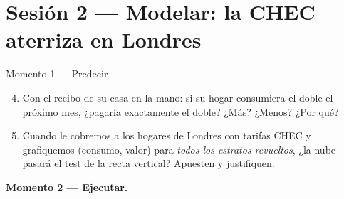\documentclass[12pt,letterpaper]{article}
\begin{document}
\section{Sesión 2 --- Modelar: la CHEC aterriza en Londres}

\begin{cajaprediccion}{Momento 1 --- Predecir}
\begin{enumerate}[label=P\arabic*., itemsep=0.1em]
    \setcounter{enumi}{3}
    \item Con el recibo de su casa en la mano: si su hogar consumiera el doble el próximo mes, ¿pagaría exactamente el doble? ¿Más? ¿Menos? ¿Por qué?
    \item Cuando le cobremos a los hogares de Londres con tarifas CHEC y grafiquemos (consumo, valor) para \emph{todos los estratos revueltos}, ¿la nube pasará el test de la recta vertical? Apuesten y justifiquen.
\end{enumerate}
\end{cajaprediccion}

\textbf{Momento 2 --- Ejecutar.}
\end{document}
